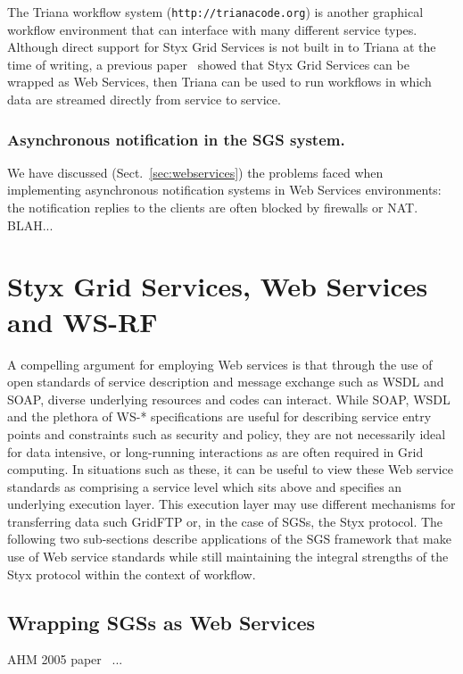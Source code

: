 \documentclass{llncs}
\begin{document}
The Triana workflow system ({\tt http://trianacode.org}) is another graphical workflow environment that can interface with many different service types.  Although direct support for Styx Grid Services is not built in to Triana at the time of writing, a previous paper~\cite{blower:2005} showed that Styx Grid Services can be wrapped as Web Services, then Triana can be used to run workflows in which data are streamed directly from service to service.

\subsubsection{Asynchronous notification in the SGS system.}
We have discussed (Sect.~\ref{sec:webservices}) the problems faced when implementing asynchronous notification systems in Web Services environments: the notification replies to the clients are often blocked by firewalls or NAT.  BLAH...


\section{Styx Grid Services, Web Services and WS-RF}\label{sec:wsrf}

A compelling argument for employing Web services is that through the use of open standards of service description and message exchange such as WSDL and SOAP, diverse underlying resources and codes can interact. While SOAP, WSDL and the plethora of WS-* specifications are useful for describing service entry points and constraints such as security and policy, they are not necessarily ideal for data intensive, or long-running interactions as are often required in Grid computing. In situations such as these, it can be useful to view these Web service standards as comprising a service level which sits above and specifies an underlying execution layer. This execution layer may use different mechanisms for transferring data such GridFTP or, in the case of SGSs, the Styx protocol. The following two sub-sections describe applications of the SGS framework that make use of Web service standards while still maintaining the integral strengths of the Styx protocol within the context of workflow.

\subsection{Wrapping SGSs as Web Services}
AHM 2005 paper~\cite{blower:2005} ...
\end{document}
